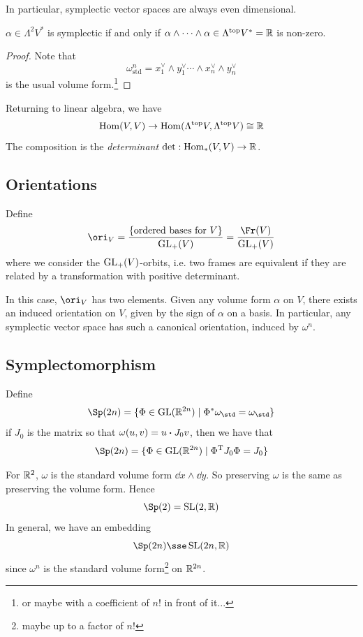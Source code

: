 \documentclass{article}
\begin{document}
\lec

In particular, symplectic vector spaces are always even dimensional.

\begin{corollary}
    \(\alpha \in \Lambda^2 V^*\) is symplectic if and only if \(\alpha \wedge \cdots \wedge \alpha \in \Lambda^{\text{top}} V^* = \mathbb{R}\) is non-zero.
\end{corollary}

\begin{proof}
    Note that
    \[\omega_{\text{std}}^n = x_1^\vee \wedge y_1^\vee \cdots \wedge x_n^\vee \wedge y_n^\vee\]
    is the usual volume form.\footnote{or maybe with a coefficient of \(n!\) in front of it...}
\end{proof}

Returning to linear algebra, we have
\[\operatorname{Hom}(V, V) \to \operatorname{Hom}(\Lambda^\text{top}V, \Lambda^\text{top}V) \cong \mathbb{R}\]
The composition is the \emph{determinant} \(\det : \operatorname{Hom}_*(V, V) \to \mathbb{R}\).

\subsection{Orientations}

Define
\[\ori_V = \frac{\{\text{ordered bases for }V\}}{\GL_+(V)} = \frac{\Fr(V)}{\GL_+(V)}\]
where we consider the \(\operatorname{GL}_+(V)\)-orbits, i.e. two frames are equivalent if they are related by a transformation with positive determinant.

In this case, \(\ori_V\) has two elements. Given any volume form \(\alpha\) on \(V\), there exists an induced orientation on \(V\), given by the sign of \(\alpha\) on a basis. In particular, any symplectic vector space has such a canonical orientation, induced by \(\omega^n\).

\subsection{Symplectomorphism}

\begin{definition}
    Define
    \[\Sp(2n) = \{\Phi \in \GL(\R^{2n}) \mid \Phi^*\omega_{\std} = \omega_{\std}\}\]
    if \(J_0\) is the matrix so that \(\omega(u, v) = u \vdot J_0 v\), then we have that
    \[\Sp(2n) = \{\Phi \in \GL(\R^{2n}) \mid \Phi^\T J_0\Phi = J_0\}\]
\end{definition}

\begin{example}
    For \(\mathbb{R}^2\), \(\omega\) is the standard volume form \(\dd x \wedge \dd y\). So preserving \(\omega\) is the same as preserving the volume form. Hence
    \[\Sp(2) = \SL(2, \R)\]
    In general, we have an embedding
    \[\Sp(2n) \sse \SL(2n, \R)\]
    since \(\omega^n\) is the standard volume form\footnote{maybe up to a factor of \(n!\)} on \(\mathbb{R}^{2n}\).
\end{example}
\end{document}
